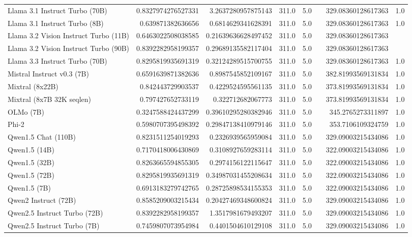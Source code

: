 \begin{table}[htp]
{\begin{tabular}{lrrrrrrr}
Llama 3.1 Instruct Turbo (70B) & 0.8327974276527331 & 3.2637280957875143 & 311.0 & 5.0 &  & 329.08360128617363 & 1.0 \\
Llama 3.1 Instruct Turbo (8B) & 0.639871382636656 & 0.6814629341628391 & 311.0 & 5.0 &  & 329.08360128617363 & 1.0 \\
Llama 3.2 Vision Instruct Turbo (11B) & 0.6463022508038585 & 0.21639636628497452 & 311.0 & 5.0 &  & 329.08360128617363 &  \\
Llama 3.2 Vision Instruct Turbo (90B) & 0.8392282958199357 & 0.29689135582117404 & 311.0 & 5.0 &  & 329.08360128617363 &  \\
Llama 3.3 Instruct Turbo (70B) & 0.8295819935691319 & 0.32124289515700755 & 311.0 & 5.0 &  & 329.08360128617363 & 1.0 \\
Mistral Instruct v0.3 (7B) & 0.6591639871382636 & 0.8987545852109167 & 311.0 & 5.0 &  & 382.81993569131834 & 1.0 \\
Mixtral (8x22B) & 0.842443729903537 & 0.4229524595561135 & 311.0 & 5.0 &  & 373.81993569131834 & 1.0 \\
Mixtral (8x7B 32K seqlen) & 0.797427652733119 & 0.322712682067773 & 311.0 & 5.0 &  & 373.81993569131834 & 1.0 \\
OLMo (7B) & 0.3247588424437299 & 0.39610295280382946 & 311.0 & 5.0 &  & 345.2765273311897 & 1.0 \\
Phi-2 & 0.5980707395498392 & 0.29847138410979146 & 311.0 & 5.0 &  & 353.7106109324759 & 1.0 \\
Qwen1.5 Chat (110B) & 0.8231511254019293 & 0.2326939565959084 & 311.0 & 5.0 &  & 329.09003215434086 & 1.0 \\
Qwen1.5 (14B) & 0.7170418006430869 & 0.3108927659283114 & 311.0 & 5.0 &  & 322.09003215434086 & 1.0 \\
Qwen1.5 (32B) & 0.8263665594855305 & 0.2974156122115647 & 311.0 & 5.0 &  & 322.09003215434086 & 1.0 \\
Qwen1.5 (72B) & 0.8295819935691319 & 0.34987031455208634 & 311.0 & 5.0 &  & 322.09003215434086 & 1.0 \\
Qwen1.5 (7B) & 0.6913183279742765 & 0.28725898534155353 & 311.0 & 5.0 &  & 322.09003215434086 & 1.0 \\
Qwen2 Instruct (72B) & 0.8585209003215434 & 0.20427469348600824 & 311.0 & 5.0 &  & 329.09003215434086 & 1.0 \\
Qwen2.5 Instruct Turbo (72B) & 0.8392282958199357 & 1.3517981679493207 & 311.0 & 5.0 &  & 329.09003215434086 & 1.0 \\
Qwen2.5 Instruct Turbo (7B) & 0.7459807073954984 & 0.4401504610129108 & 311.0 & 5.0 &  & 329.09003215434086 & 1.0 \\

\end{tabular}}
\end{table}
